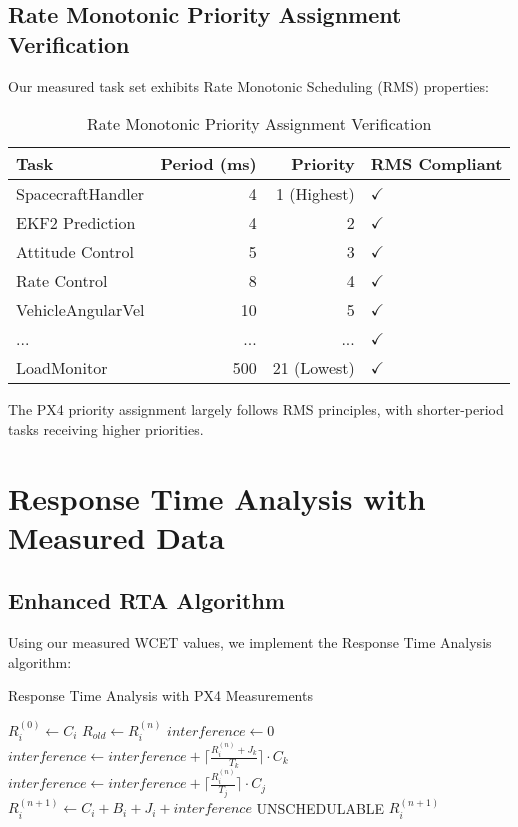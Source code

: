 \documentclass[12pt,a4paper]{article}
\begin{document}
\subsection{Rate Monotonic Priority Assignment Verification}

Our measured task set exhibits Rate Monotonic Scheduling (RMS) properties:

\begin{table}[H]
\centering
\begin{tabular}{|l|r|r|l|}
\hline
\textbf{Task} & \textbf{Period (ms)} & \textbf{Priority} & \textbf{RMS Compliant} \\
\hline
SpacecraftHandler & 4 & 1 (Highest) & $\checkmark$ \\
EKF2 Prediction & 4 & 2 & $\checkmark$ \\
Attitude Control & 5 & 3 & $\checkmark$ \\
Rate Control & 8 & 4 & $\checkmark$ \\
VehicleAngularVel & 10 & 5 & $\checkmark$ \\
... & ... & ... & $\checkmark$ \\
LoadMonitor & 500 & 21 (Lowest) & $\checkmark$ \\
\hline
\end{tabular}
\caption{Rate Monotonic Priority Assignment Verification}
\end{table}

The PX4 priority assignment largely follows RMS principles, with shorter-period tasks receiving higher priorities.

\section{Response Time Analysis with Measured Data}

\subsection{Enhanced RTA Algorithm}

Using our measured WCET values, we implement the Response Time Analysis algorithm:

\begin{algorithm}
\caption{Response Time Analysis with PX4 Measurements}
\begin{algorithmic}[1]
    \State $R_i^{(0)} \gets C_i$
    \Repeat
        \State $R_{old} \gets R_i^{(n)}$
        \State $interference \gets 0$
            \State $interference \gets interference + \lceil \frac{R_i^{(n)} + J_k}{T_k} \rceil \cdot C_k$
        \EndFor
            \State $interference \gets interference + \lceil \frac{R_i^{(n)}}{T_j} \rceil \cdot C_j$
        \EndFor
        \State $R_i^{(n+1)} \gets C_i + B_i + J_i + interference$
            \State \Return UNSCHEDULABLE
        \EndIf
    \State \Return $R_i^{(n+1)}$
\EndProcedure
\end{algorithmic}
\end{algorithm}
\end{document}
